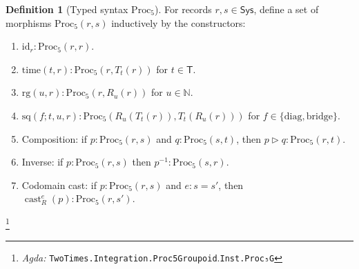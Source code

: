 \documentclass{article}
\newcommand{\Sys}{\mathsf{Sys}}
\newcommand{\Time}{\mathsf{T}}
\newcommand{\RG}{\mathbb{N}}
\newcommand{\castR}[2]{\operatorname{cast}_R^{#1}\!\left(#2\right)}
\newcommand{\Agda}[1]{\texttt{#1}}
\newcommand{\AgdaRef}[2]{\emph{Agda: }\Agda{#1}.\Agda{#2}}
\newcommand{\AgdaNote}[2]{\footnote{\AgdaRef{#1}{#2}}}
\theoremstyle{definition}
\newtheorem{definition}{Definition}[section]
\theoremstyle{plain}
\begin{document}
\begin{definition}[Typed syntax $\mathrm{Proc}_5$]
\label{def:Proc5}
For records $r,s\in\Sys$, define a set of morphisms $\mathrm{Proc}_5(r,s)$
inductively by the constructors:
\begin{enumerate}[label=\textbf{(G\arabic*)},leftmargin=*,itemsep=0.4em]
\item $\mathrm{id}_r : \mathrm{Proc}_5(r,r)$.
\item $\mathrm{time}(t,r): \mathrm{Proc}_5(r,T_t(r))$ for $t\in\Time$.
\item $\mathrm{rg}(u,r): \mathrm{Proc}_5(r,R_u(r))$ for $u\in\RG$.
\item $\mathrm{sq}(f;t,u,r): \mathrm{Proc}_5(R_u(T_t(r)),T_t(R_u(r)))$ for
$f\in\{\mathrm{diag},\mathrm{bridge}\}$.
\item Composition: if $p:\mathrm{Proc}_5(r,s)$ and $q:\mathrm{Proc}_5(s,t)$, then
$p\triangleright q:\mathrm{Proc}_5(r,t)$.
\item Inverse: if $p:\mathrm{Proc}_5(r,s)$ then $p^{-1}:\mathrm{Proc}_5(s,r)$.
\item Codomain cast: if $p:\mathrm{Proc}_5(r,s)$ and $e:s=s'$, then
$\castR{e}{p}:\mathrm{Proc}_5(r,s')$.
\end{enumerate}
\end{definition}
\AgdaNote{TwoTimes.Integration.Proc5Groupoid}{Inst.Proc₅G}
\end{document}
